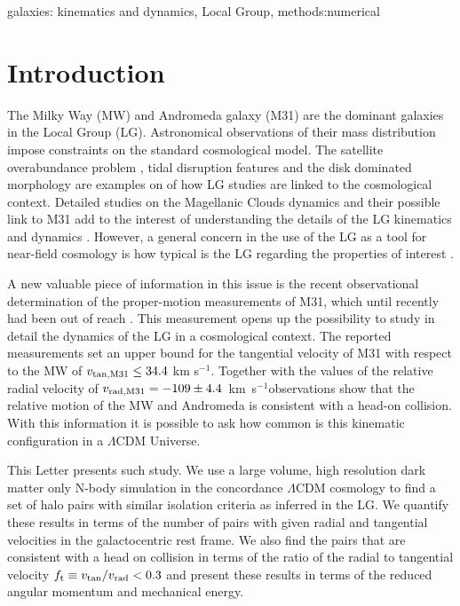 \documentclass{emulateapj}
\newcommand{\kms}{\,km~s$^{-1}$}
\begin{document}
\begin{keywords}
{galaxies: kinematics and dynamics, Local Group, methods:numerical}
\end{keywords}

\section{Introduction}

The Milky Way (MW) and Andromeda galaxy (M31) are the dominant galaxies in the Local Group (LG). Astronomical observations of their mass distribution impose constraints on the standard cosmological model. The satellite overabundance problem \citep{Klypin99,Moore99}, tidal disruption features \citep{pandas09} and the disk dominated morphology \citep{Kazantzidis2008} are examples on of how LG studies are linked to the cosmological context. Detailed studies on the Magellanic Clouds dynamics and their possible link to M31 add to the interest of understanding the details of the LG kinematics and dynamics \citep{Besla2007,Tollerud2011,Knebe2011,Fouquet2012,Teyssier2012}. However, a general concern in the use of the LG as a tool for near-field cosmology \citep{Freeman2002,Peebles2010} is how typical is the LG regarding the properties of interest \citep{Busha2011,Liu2011,ForeroRomero2011,Purcell2012}. 

A new valuable piece of information in this issue is the recent observational determination of the proper-motion measurements of M31, which until recently had been out of reach \citep{vanderMarel12}. This measurement opens up the possibility to study in detail the dynamics of the LG in a cosmological context. The reported measurements set an upper bound for the tangential velocity of M31 with respect to the MW of $v_{\rm tan,M31}\leq 34.4$ km s$^{-1}$. Together with the values of the relative radial velocity of $v_{\rm rad,M31}=-109\pm 4.4$ \kms observations show that the relative motion of the MW and Andromeda is consistent with a head-on collision. With this information it is possible to ask how common is this kinematic configuration in a $\Lambda$CDM Universe.

This Letter presents such study. We use a large volume, high resolution dark matter only N-body simulation in the concordance $\Lambda$CDM cosmology to find a set of halo pairs with similar isolation criteria as inferred in the LG. We quantify these results in terms of the number of pairs with given radial and tangential velocities in the galactocentric rest frame. We also find the pairs that are consistent with a head on collision in terms of the ratio of the radial to tangential velocity $f_{\rm t}\equiv v_{\rm tan}/v_{\rm rad}<0.3$ and present these results in terms of the reduced angular momentum and mechanical energy.
\end{document}
